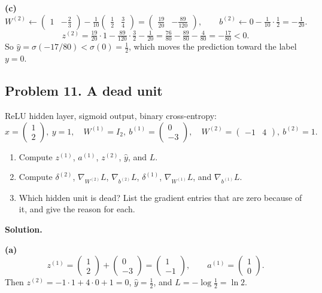 \textbf{(c)}
\[
W^{(2)} \leftarrow \begin{pmatrix}1 & -\tfrac23\end{pmatrix} - \tfrac1{10}\begin{pmatrix}\tfrac12 & \tfrac34\end{pmatrix} = \begin{pmatrix}\tfrac{19}{20} & -\tfrac{89}{120}\end{pmatrix},\qquad b^{(2)} \leftarrow 0 - \tfrac1{10}\cdot\tfrac12 = -\tfrac1{20}.
\]
\[
z^{(2)} = \tfrac{19}{20}\cdot 1 - \tfrac{89}{120}\cdot\tfrac32 - \tfrac1{20} = \tfrac{76}{80} - \tfrac{89}{80} - \tfrac{4}{80} = -\tfrac{17}{80} < 0.
\]
So $\hat y = \sigma(-17/80) < \sigma(0) = \tfrac12$, which moves the prediction toward the label $y = 0$.

\subsection*{Problem 11. A dead unit}

ReLU hidden layer, sigmoid output, binary cross-entropy:
\[
x = \begin{pmatrix}1\\2\end{pmatrix},\ y = 1,\quad W^{(1)} = I_2,\ b^{(1)} = \begin{pmatrix}0\\-3\end{pmatrix},\quad W^{(2)} = \begin{pmatrix}-1 & 4\end{pmatrix},\ b^{(2)} = 1.
\]

\begin{enumerate}[label=(\alph*)]
\item Compute $z^{(1)}$, $a^{(1)}$, $z^{(2)}$, $\hat y$, and $L$.
\item Compute $\delta^{(2)}$, $\nabla_{W^{(2)}}L$, $\nabla_{b^{(2)}}L$, $\delta^{(1)}$, $\nabla_{W^{(1)}}L$, and $\nabla_{b^{(1)}}L$.
\item Which hidden unit is dead? List the gradient entries that are zero because of it, and give the reason for each.
\end{enumerate}

\textbf{Solution.}

\textbf{(a)}
\[
z^{(1)} = \begin{pmatrix}1\\2\end{pmatrix} + \begin{pmatrix}0\\-3\end{pmatrix} = \begin{pmatrix}1\\-1\end{pmatrix},\qquad a^{(1)} = \begin{pmatrix}1\\0\end{pmatrix}.
\]
Then $z^{(2)} = -1\cdot 1 + 4\cdot 0 + 1 = 0$, $\hat y = \tfrac12$, and $L = -\log\tfrac12 = \ln 2$.

